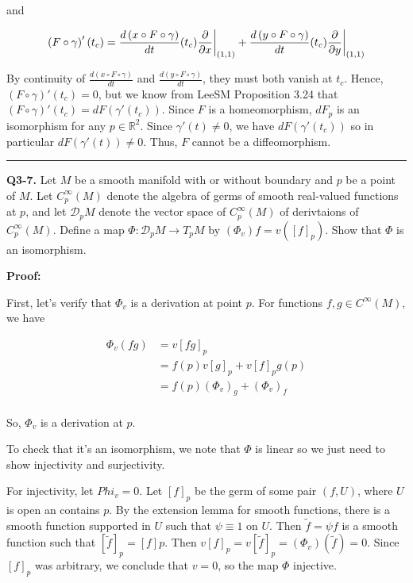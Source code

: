 \documentclass{article}
\newcommand{\R}{\mathbb{R}}
\newcommand{\restr}[2]{{%
  \left.\kern-\nulldelimiterspace %
  #1 %
  \vphantom{\big|} %
  \right|_{#2} %
  }}
\begin{document}
and 

\[ \left( F \circ \gamma \right)'(t_c) = \frac{d\left( x \circ F \circ \gamma \right)}{dt}(t_c) \restr{\frac{\partial}{\partial x}}{(1,1)} + \frac{d\left( y \circ F \circ \gamma \right)}{dt}(t_c) \restr{\frac{\partial}{\partial y}}{(1,1)}  \]

By continuity of $\frac{d\left( x \circ F \circ \gamma \right)}{dt}$ and $\frac{d\left( y \circ F \circ \gamma \right)}{dt}$, they must both vanish at $t_c$. Hence, $\left( F \circ \gamma \right)'(t_c) = 0$, but we know from LeeSM Proposition 3.24 that $\left( F \circ \gamma \right)'(t_c) = dF(\gamma'(t_c))$. Since $F$ is a homeomorphism, $dF_p$ is an isomorphism for any $p \in \R^2$. Since $\gamma'(t) \neq 0$, we have $dF \left( \gamma'(t_c) \right)$ so in particular $dF(\gamma'(t))\neq 0$. Thus, $F$ cannot be a diffeomorphism.

\vskip 0.5cm
\hrule 
\vskip 0.5cm



\textbf{Q3-7.} Let $M$ be a smooth manifold with or without boundary and $p$ be a point of $M$. Let $C^{\infty}_p (M)$ denote the algebra of germs of smooth real-valued functions at $p$, and let $\mathcal{D}_{p} M $ denote the vector space of $C^{\infty}_p (M)$ of derivtaions of $C^{\infty}_p (M)$. Define a map $\Phi : \mathcal{D}_{p} M \rightarrow T_pM$ by $\left( \Phi_{v} \right) f = v\left( [f]_p \right)$. Show that $\Phi$ is an isomorphism.

\vskip 0.5cm
\textbf{Proof:}

First, let's verify that $\Phi_v$ is a derivation at point $p$. For functions $f,g \in C^{\infty}(M)$, we have 

\begin{align*}
  \Phi_v \left( fg \right) &= v [fg]_p  \\
  &= f(p) v[g]_p+ v[f]_p g(p) \\
  &= f(p) \left( \Phi_v \right)_g + \left( \Phi_v\right)_f \\
\end{align*}

So, $\Phi_v$ is a derivation at $p$.

\vskip 0.5cm
To check that it's an isomorphism, we note that $\Phi$ is linear so we just need to show injectivity and surjectivity.

\vskip 0.25cm
For injectivity, let $Phi_v = 0$. Let $[f]_p$ be the germ of some pair $(f, U)$, where $U$ is open an contains $p$. By the extension lemma for smooth functions, there is a smooth function supported in $U$ such that $\psi \equiv 1$ on $U$. Then $\tilde{f} = \psi f$ is a smooth function such that $[\tilde{f}]_p = [f]p$. Then $v[f]_p = v[\tilde{f}]_p = (\Phi_v)(\tilde{f}) = 0$. Since $[f]_p$ was arbitrary, we conclude that $v = 0$, so the map $\Phi$ injective.
\end{document}

